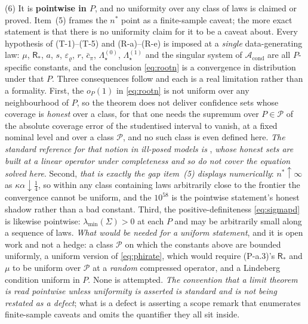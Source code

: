 \begin{remark}
(6) It is \textbf{pointwise in $P$}, and no uniformity over any class of laws is claimed or proved.
Item~(5) frames the $n^{\ast}$ point as a
finite-sample caveat; the more exact statement is that there is no uniformity claim for it to be a caveat
about. Every hypothesis of (T-1)--(T-5) and (R-a)--(R-e) is imposed at a \emph{single} data-generating
law: $\mu$, $\mathsf R_\ast$, $a$, $s$, $\varepsilon_\varrho$, $r$, $\bar c_\pi$, $\Lambda^{(0)}_\star$,
$\Lambda^{(1)}_\star$ and the singular system of $\mathcal A_{\mathrm{cond}}$ are all $P$-specific
constants, and the conclusion \eqref{eq:rootn} is a convergence in distribution under that $P$.
Three consequences follow and each is a real limitation rather than a formality. First, the
$o_P(1)$ in \eqref{eq:rootn} is not uniform over any neighbourhood of $P$, so the theorem does not deliver
confidence sets whose coverage is \emph{honest} over a class, for that one needs the supremum over
$P\in\mathcal P$ of the absolute coverage error of the studentised interval to vanish, at a fixed nominal
level and over a class $\mathcal P$, and no such class is even defined here.
\emph{The standard reference for that notion in ill-posed models is}
\citet{babii2016}, \emph{whose honest sets are built at a linear operator under
completeness and so do not cover the equation solved here}.
Second, \emph{that is exactly the gap item~(5)
displays numerically}: $n^{\ast}\uparrow\infty$ as $\kappa\alpha\downarrow\tfrac14$, so within any class
containing laws arbitrarily close to the frontier the convergence cannot be uniform, and the $10^{58}$ is
the pointwise statement's honest shadow rather than a bad constant. Third, the positive-definiteness
\eqref{eq:sigmapd} is likewise pointwise: $\lambda_{\min}(\Sigma)>0$ at each $P$ and may be arbitrarily
small along a sequence of laws. \emph{What would be needed for a uniform statement}, and it is open work
and not a hedge: a class $\mathcal P$ on which the constants above are bounded uniformly, a uniform version
of \eqref{eq:phirate}, which would require (P-a.3)'s $\mathsf R_\ast$ and $\mu$ to be uniform over
$\mathcal P$ at a \emph{random} compressed operator, and a Lindeberg condition uniform in $P$. None is
attempted. \emph{The convention that a limit theorem is read pointwise unless uniformity is asserted is
standard and is not being restated as a defect}; what is a defect is asserting a scope remark that
enumerates finite-sample caveats and omits the quantifier they all sit inside.
\end{remark}

